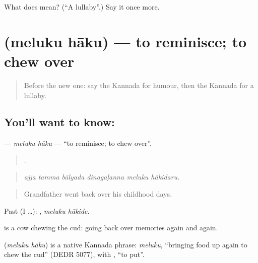 \begin{tcolorbox}[breakable,colback=teal!4,colframe=teal!35!black,title={Before you move on}]
What does  mean? (\textquotedblleft{}A lullaby\textquotedblright{}.) Say it once more.
\end{tcolorbox}
\section[\texorpdfstring{\kn{ಮೆಲುಕು} \kn{ಹಾಕು} (meluku hāku)}{ಮೆಲುಕು ಹಾಕು (meluku hāku)}]{  (meluku hāku) — to reminisce; to chew over}

\label{lesson:KA-C532-meluku-haku}



\begin{quote}
Before the new one: say the Kannada for humour, then the Kannada for a lullaby.
\end{quote}

\subsection*{You'll want to know:  }
\textbf{ } — \emph{meluku hāku} — \textquotedblleft{}to reminisce; to chew over\textquotedblright{}.

\begin{quote}
     .
\end{quote}

\begin{quote}
\emph{ajja tamma bālyada dinagaḷannu meluku hākidaru.}
\end{quote}

\begin{quote}
Grandfather went back over his childhood days.
\end{quote}

Past (I …):  , \emph{meluku hākide}.

 is a cow chewing the cud: going back over memories again and again.

\begin{cousinweb}
\textbf{ } (\emph{meluku hāku}) is a native Kannada phrase: \emph{meluku}, \textquotedblleft{}bringing food up again to chew the cud\textquotedblright{} (DEDR 5077), with , \textquotedblleft{}to put\textquotedblright{}.
\end{cousinweb}

